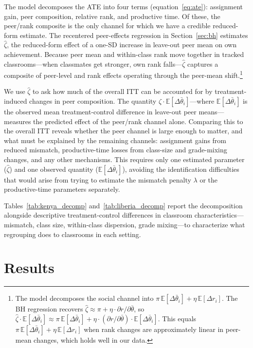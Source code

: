 \documentclass[11pt]{article}
\newcommand{\E}{\mathbb{E}}
\begin{document}
The model decomposes the ATE into four terms (equation~\ref{eq:ate}): assignment gain, peer composition, relative rank, and productive time. Of these, the peer/rank composite is the only channel for which we have a credible reduced-form estimate. The recentered peer-effects regression in Section~\ref{sec:bh} estimates $\hat{\zeta}$, the reduced-form effect of a one-SD increase in leave-out peer mean on own achievement. Because peer mean and within-class rank move together in tracked classrooms---when classmates get stronger, own rank falls---$\hat{\zeta}$ captures a composite of peer-level and rank effects operating through the peer-mean shift.\footnote{The model decomposes the social channel into $\pi\,\E[\Delta\bar{\theta}_i] + \eta\,\E[\Delta r_i]$. The BH regression recovers $\hat{\zeta} \approx \pi + \eta \cdot \partial r / \partial \bar{\theta}$, so $\hat{\zeta} \cdot \E[\Delta\bar{\theta}_i] \approx \pi\,\E[\Delta\bar{\theta}_i] + \eta \cdot (\partial r / \partial \bar{\theta}) \cdot \E[\Delta\bar{\theta}_i]$. This equals $\pi\,\E[\Delta\bar{\theta}_i] + \eta\,\E[\Delta r_i]$ when rank changes are approximately linear in peer-mean changes, which holds well in our data.}

We use $\hat{\zeta}$ to ask how much of the overall ITT can be accounted for by treatment-induced changes in peer composition. The quantity $\hat{\zeta} \cdot \E[\Delta\bar{\theta}_i]$---where $\E[\Delta\bar{\theta}_i]$ is the observed mean treatment-control difference in leave-out peer means---measures the predicted effect of the peer/rank channel alone. Comparing this to the overall ITT reveals whether the peer channel is large enough to matter, and what must be explained by the remaining channels: assignment gains from reduced mismatch, productive-time losses from class-size and grade-mixing changes, and any other mechanisms. This requires only one estimated parameter ($\hat{\zeta}$) and one observed quantity ($\E[\Delta\bar{\theta}_i]$), avoiding the identification difficulties that would arise from trying to estimate the mismatch penalty $\lambda$ or the productive-time parameters separately.

Tables~\ref{tab:kenya_decomp} and~\ref{tab:liberia_decomp} report the decomposition alongside descriptive treatment-control differences in classroom characteristics---mismatch, class size, within-class dispersion, grade mixing---to characterize what regrouping does to classrooms in each setting.

\section{Results}
\label{sec:results}
\end{document}
